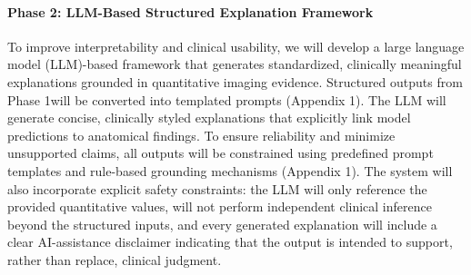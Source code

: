 \documentclass[12pt]{article}
\begin{document}
\paragraph{Phase 2: LLM-Based Structured Explanation Framework}
To improve interpretability and clinical usability, we will develop a large language model (LLM)-based framework that generates standardized, clinically meaningful explanations grounded in quantitative imaging evidence. Structured outputs from Phase 1will be converted into templated prompts (Appendix 1). The LLM will generate concise, clinically styled explanations that explicitly link model predictions to anatomical findings. To ensure reliability and minimize unsupported claims, all outputs will be constrained using predefined prompt templates and rule-based grounding mechanisms (Appendix 1). The system will also incorporate explicit safety constraints: the LLM will only reference the provided quantitative values, will not perform independent clinical inference beyond the structured inputs, and every generated explanation will include a clear AI-assistance disclaimer indicating that the output is intended to support, rather than replace, clinical judgment.
\end{document}
